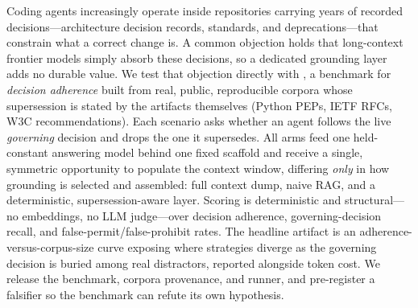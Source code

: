 Coding agents increasingly operate inside repositories carrying years of recorded
decisions---architecture decision records, standards, and deprecations---that
constrain what a correct change is. A common objection holds that long-context
frontier models simply absorb these decisions, so a dedicated grounding layer adds
no durable value. We test that objection directly with \benchname, a benchmark for
\emph{decision adherence} built from real, public, reproducible corpora whose
supersession is stated by the artifacts themselves (Python PEPs, IETF RFCs, W3C
recommendations). Each scenario asks whether an agent follows the live
\emph{governing} decision and drops the one it supersedes. All arms feed one
held-constant answering model behind one fixed scaffold and receive a single,
symmetric opportunity to populate the context window, differing \emph{only} in how
grounding is selected and assembled: full context dump, naive RAG, and a
deterministic, supersession-aware layer. Scoring is deterministic and
structural---no embeddings, no LLM judge---over decision adherence,
governing-decision recall, and false-permit/false-prohibit rates. The headline
artifact is an adherence-versus-corpus-size curve exposing where strategies diverge
as the governing decision is buried among real distractors, reported alongside
token cost.  We release the benchmark, corpora
provenance, and runner, and pre-register a falsifier so the benchmark can refute
its own hypothesis.
